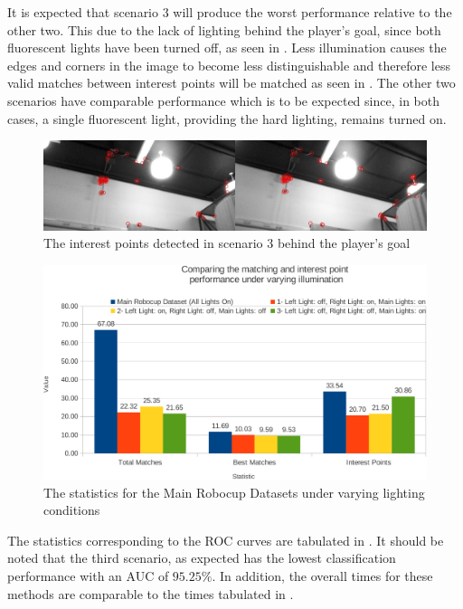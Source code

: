 \documentclass[11pt]{report}
\begin{document}
It is expected that scenario $3$ will produce the worst performance relative to the other two. This due to the lack of lighting behind the player's goal, since both fluorescent lights have been turned off, as seen in . Less illumination causes the edges and corners in the image to become less distinguishable and therefore less valid matches between interest points will be matched as seen in . The other two scenarios have comparable performance which is to be expected since, in both cases, a single fluorescent light, providing the hard lighting, remains turned on.\\

\begin{figure}[h!] 
  \centering
    \includegraphics[width=1.0\textwidth]{../Drawings/Matching/dataset_lighting_incorrect_matches.jpg}
    \caption{The interest points detected in scenario $3$ behind the player's goal}
    \label{fig:lighting_pg}
\end{figure}

\begin{figure}[h!] 
  \centering
    \includegraphics[width=1.0\textwidth]{../Drawings/Graphs/varyingLight_matches_keypoints_best.pdf}
    \caption{The statistics for the Main Robocup Datasets under varying lighting conditions}
    \label{fig:varyingLighting_matches_keypoints}
\end{figure}


The statistics corresponding to the ROC curves are tabulated in . It should be noted that the third scenario, as expected has the lowest classification performance with an AUC of $95.25\%$. In addition, the overall times for these methods are comparable to the times tabulated in .\\
\end{document}
